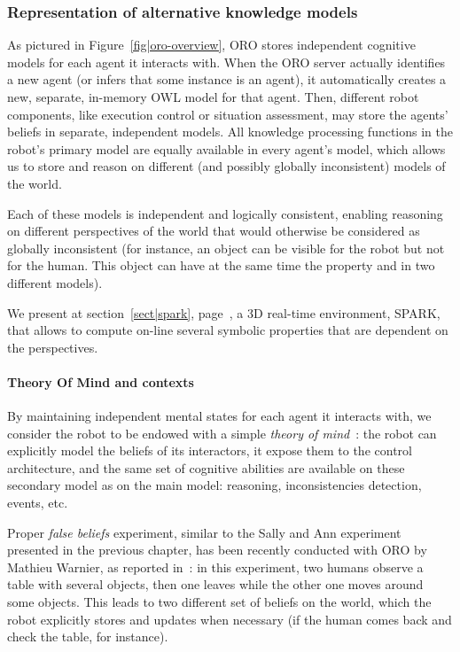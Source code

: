 \subsubsection{Representation of alternative knowledge models}
\label{sect|alterite}

As pictured in Figure~\ref{fig|oro-overview}, ORO stores independent cognitive
models for each agent it interacts with. When the ORO server actually
identifies a new agent (or infers that some instance is an agent), it
automatically creates a new, separate, in-memory OWL model for that agent.
Then, different robot components, like execution control or situation
assessment, may store the agents' beliefs in separate, independent models. All
knowledge processing functions in the robot's primary model are equally
available in every agent's model, which allows us to store and reason on
different (and possibly globally inconsistent) models of the world.

Each of these models is independent and logically consistent, enabling
reasoning on different perspectives of the world that would otherwise be
considered as globally inconsistent (for instance, an object can be visible for
the robot but not for the human. This object can have at the same time the
property  and  in two different models).

We present at section~\ref{sect|spark}, page~\pageref{sect|spark}, a 3D
real-time environment, SPARK, that allows to compute on-line several symbolic
properties that are dependent on the perspectives.

\paragraph{Theory Of Mind and contexts} \label{sect|theory-of-mind}

By maintaining independent mental states for each agent it interacts with, we
consider the robot to be endowed with a simple \emph{theory of
mind}~\cite{Scassellati2002}: the robot can explicitly model the beliefs of its
interactors, it expose them to the control architecture, and the same set of
cognitive abilities are available on these secondary model as on the main
model: reasoning, inconsistencies detection, events, etc.

Proper \emph{false beliefs} experiment, similar to the Sally and Ann experiment
presented in the previous chapter, has been recently conducted with ORO
by Mathieu Warnier, as reported in~\cite{Warnier2012a}: in this experiment, two
humans observe a table with several objects, then one leaves while the other
one moves around some objects. This leads to two different set of beliefs on
the world, which the robot explicitly stores and updates when necessary (if the
human comes back and check the table, for instance).

